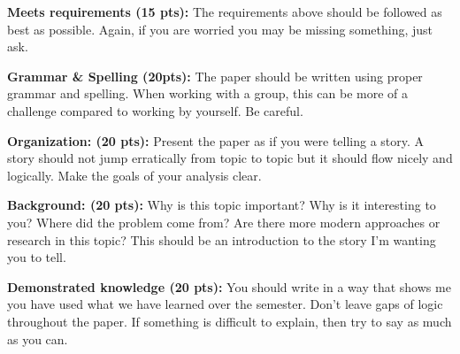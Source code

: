 \documentclass[12pt]{amsbook}
\begin{document}
\textbf{Meets requirements (15 pts):} The requirements above should be followed as best as possible.  Again, if you are worried you may be missing something, just ask.

\textbf{Grammar \& Spelling (20pts):} The paper should be written using proper grammar and spelling.  When working with a group, this can be more of a challenge compared to working by yourself.  Be careful.

\textbf{Organization: (20 pts):} Present the paper as if you were telling a story.  A story should not jump erratically from topic to topic but it should flow nicely and logically.   Make the goals of your analysis clear.

\textbf{Background: (20 pts):} Why is this topic important?  Why is it interesting to you? Where did the problem come from?  Are there more modern approaches or research in this topic?  This should be an introduction to the story I'm wanting you to tell.

\textbf{Demonstrated knowledge (20 pts):} You should write in a way that shows me you have used what we have learned over the semester.  Don't leave gaps of logic throughout the paper.  If something is difficult to explain, then try to say as much as you can.
\end{document}
